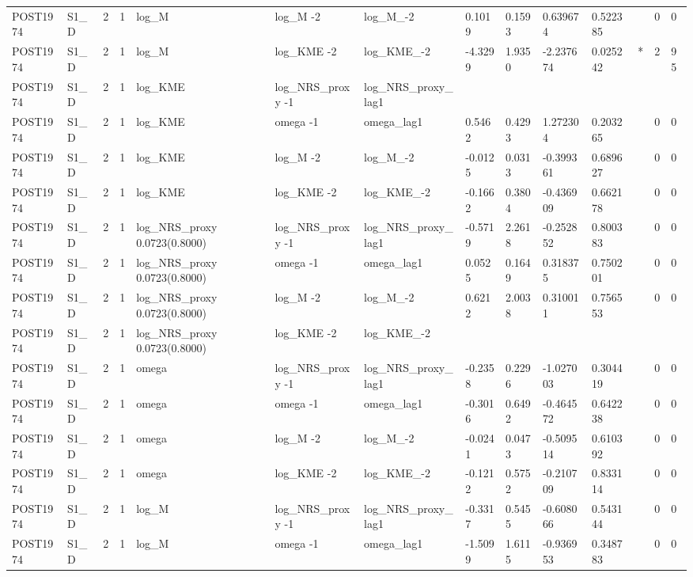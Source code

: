 \begin{tabular}{llllllllllllll}
POST1974 & S1\_D & 2 & 1 & log\_M & log\_M -2 & log\_M\_-2 & 0.1019 & 0.1593 & 0.639674 & 0.522385 &  & 0 & 0 \\
POST1974 & S1\_D & 2 & 1 & log\_M & log\_KME -2 & log\_KME\_-2 & -4.3299 & 1.9350 & -2.237674 & 0.025242 & * & 2 & 95 \\
POST1974 & S1\_D & 2 & 1 & log\_KME & log\_NRS\_proxy -1 & log\_NRS\_proxy\_lag1 &  &  &  &  &  &  &  \\
POST1974 & S1\_D & 2 & 1 & log\_KME & omega -1 & omega\_lag1 & 0.5462 & 0.4293 & 1.272304 & 0.203265 &  & 0 & 0 \\
POST1974 & S1\_D & 2 & 1 & log\_KME & log\_M -2 & log\_M\_-2 & -0.0125 & 0.0313 & -0.399361 & 0.689627 &  & 0 & 0 \\
POST1974 & S1\_D & 2 & 1 & log\_KME & log\_KME -2 & log\_KME\_-2 & -0.1662 & 0.3804 & -0.436909 & 0.662178 &  & 0 & 0 \\
POST1974 & S1\_D & 2 & 1 & log\_NRS\_proxy 0.0723(0.8000) & log\_NRS\_proxy -1 & log\_NRS\_proxy\_lag1 & -0.5719 & 2.2618 & -0.252852 & 0.800383 &  & 0 & 0 \\
POST1974 & S1\_D & 2 & 1 & log\_NRS\_proxy 0.0723(0.8000) & omega -1 & omega\_lag1 & 0.0525 & 0.1649 & 0.318375 & 0.750201 &  & 0 & 0 \\
POST1974 & S1\_D & 2 & 1 & log\_NRS\_proxy 0.0723(0.8000) & log\_M -2 & log\_M\_-2 & 0.6212 & 2.0038 & 0.310011 & 0.756553 &  & 0 & 0 \\
POST1974 & S1\_D & 2 & 1 & log\_NRS\_proxy 0.0723(0.8000) & log\_KME -2 & log\_KME\_-2 &  &  &  &  &  &  &  \\
POST1974 & S1\_D & 2 & 1 & omega & log\_NRS\_proxy -1 & log\_NRS\_proxy\_lag1 & -0.2358 & 0.2296 & -1.027003 & 0.304419 &  & 0 & 0 \\
POST1974 & S1\_D & 2 & 1 & omega & omega -1 & omega\_lag1 & -0.3016 & 0.6492 & -0.464572 & 0.642238 &  & 0 & 0 \\
POST1974 & S1\_D & 2 & 1 & omega & log\_M -2 & log\_M\_-2 & -0.0241 & 0.0473 & -0.509514 & 0.610392 &  & 0 & 0 \\
POST1974 & S1\_D & 2 & 1 & omega & log\_KME -2 & log\_KME\_-2 & -0.1212 & 0.5752 & -0.210709 & 0.833114 &  & 0 & 0 \\
POST1974 & S1\_D & 2 & 1 & log\_M & log\_NRS\_proxy -1 & log\_NRS\_proxy\_lag1 & -0.3317 & 0.5455 & -0.608066 & 0.543144 &  & 0 & 0 \\
POST1974 & S1\_D & 2 & 1 & log\_M & omega -1 & omega\_lag1 & -1.5099 & 1.6115 & -0.936953 & 0.348783 &  & 0 & 0 \\

\end{tabular}
